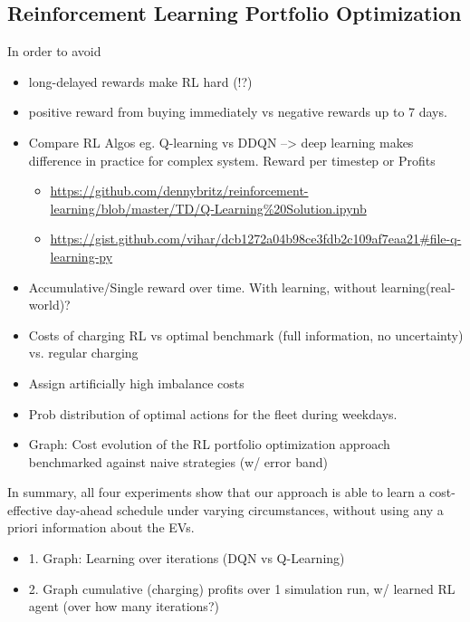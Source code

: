 \documentclass[a4paper, 12pt]{article}
\let\cite\shortcite
\begin{document}
\subsection{Reinforcement Learning Portfolio Optimization}
\label{sec:org6228c31}
In order to avoid


\begin{itemize}
\item long-delayed rewards make RL hard (!?)
\item positive reward from buying immediately vs negative rewards up to 7 days.
\item Compare RL Algos eg. Q-learning vs DDQN --> deep learning makes difference in
practice for complex system. Reward per timestep or Profits
\begin{itemize}
\item \url{https://github.com/dennybritz/reinforcement-learning/blob/master/TD/Q-Learning\%20Solution.ipynb}
\item \url{https://gist.github.com/vihar/dcb1272a04b98ce3fdb2c109af7eaa21\#file-q-learning-py}
\end{itemize}
\item Accumulative/Single reward over time. With learning, without learning(real-world)?
\item Costs of charging RL vs optimal benchmark (full information, no uncertainty)
vs. regular charging
\item Assign artificially high imbalance costs

\item Prob distribution of optimal actions for the fleet during weekdays. \cite{vaya14_optim}
\end{itemize}


\begin{itemize}
\item Graph: Cost evolution of the RL portfolio optimization approach benchmarked
against naive strategies (w/ error band)
\end{itemize}


In summary, all four experiments show that our approach is
able to learn a cost-effective day-ahead schedule under varying
circumstances, without using any a priori information about
the EVs.


\begin{itemize}
\item 1. Graph: Learning over iterations (DQN vs Q-Learning)
\item 2. Graph cumulative (charging) profits over 1 simulation run, w/ learned RL agent (over
how many iterations?)
\end{itemize}
\end{document}
